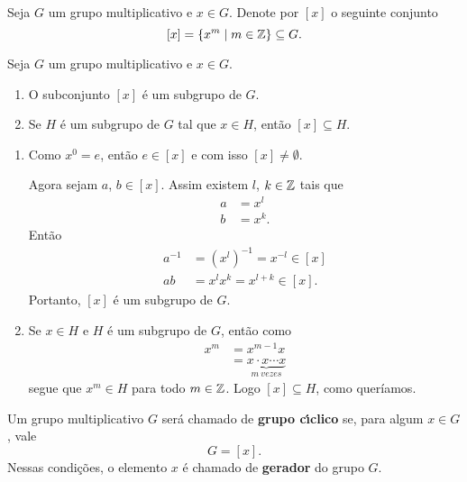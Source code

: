 \begin{definicao}
	Seja $G$ um grupo multiplicativo e $x \in G$. Denote por $[x]$ o seguinte conjunto
	\[
	    [x] = \{x^m \mid m \in \mathbb{Z}\} \subseteq G.
	\]	
\end{definicao}

\begin{proposicao}
    Seja $G$ um grupo multiplicativo e $x \in G$.
    \begin{enumerate}[label={\roman*})]
        \item O subconjunto $[x]$ \'e um subgrupo de $G$.

        \item Se $H$ \'e um subgrupo de $G$ tal que $x \in H$, ent\~ao $[x] \subseteq H$.
    \end{enumerate}
\end{proposicao}
\begin{prova}
	\begin{enumerate}[label={\roman*})]
		\item Como $x^0 = e$, então $e \in [x]$ e com isso $[x] \ne \emptyset$.

		Agora sejam $a$, $b \in [x]$. Assim existem $l$, $k \in \mathbb{Z}$ tais que
		\begin{align*}
			a &= x^l\\
			b &= x^k.
		\end{align*}
		Então
		\begin{align*}
			a^{-1} &= (x^l)^{-1} = x^{-l} \in [x]\\
			ab &= x^lx^k = x^{l + k} \in [x].
		\end{align*}
		Portanto, $[x]$ é um subgrupo de $G$.

		\item Se $x \in H$ e $H$ é um subgrupo de $G$, então como
		\begin{align*}
			x^m &=  x^{m-1}x\\
			&=\underbrace{x\cdot x \cdots x}_{m\ vezes}
		\end{align*}
		segue que $x^m \in H$ para todo $m \in \mathbb{Z}$. Logo $[x] \subseteq H$, como queríamos.
	\end{enumerate}
\end{prova}

\begin{definicao}
    Um grupo multiplicativo $G$ ser\'a chamado de \textbf{grupo c{\'\i}clico} se, para algum $x \in G$, vale
    \[
        G = [x].
    \]
    Nessas condi\c{c}\~oes, o elemento $x$  \'e chamado de \textbf{gerador} do grupo $G$.
\end{definicao}

